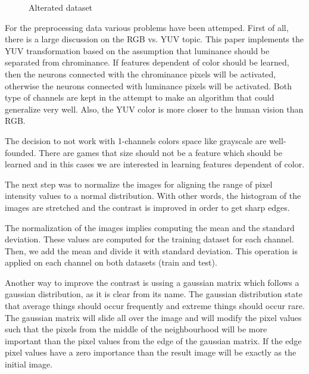 \begin{figure}[h]
	\begin{center}
		\caption{Alterated dataset} \label{fig:states}
    \end{center}
\end{figure}
\newpage

For the preprocessing data various problems have been attemped. First of all, there is a large discussion on the RGB vs. YUV topic. This paper implements the YUV transformation based on the assumption that luminance should be separated from chrominance. If features dependent of color should be learned, then the neurons connected with the chrominance pixels will be activated, otherwise the neurons connected with luminance pixels will be activated. Both type of channels are kept in the attempt to make an algorithm that could generalize very well. Also, the YUV color is more closer to the human vision than RGB. 

The decision to not work with 1-channels colors space like grayscale are well-founded. There are games that size should not be a feature which should be learned and in this cases we are interested in learning features dependent of color.

The next step was to normalize the images for aligning the range of pixel intensity values to a normal distribution. With other words, the histogram of the images are stretched and the contrast is improved in order to get sharp edges.

The normalization of the images implies computing the mean and the standard deviation. These values are computed for the training dataset for each channel. Then, we add the mean and divide it with standard deviation. This operation is applied on each channel on both datasets (train and test).

Another way to improve the contrast is ussing a gaussian matrix which follows a gaussian distribution, as it is clear from its name. The gaussian distribution state that average things should occur frequently and extreme things should occur rare. The gaussian matrix will slide all over the image and will modify the pixel values such that the pixels from the middle of the neighbourhood will be more important than the pixel values from the edge of the gaussian matrix. If the edge pixel values have a zero importance than the result image will be exactly as the initial image.

